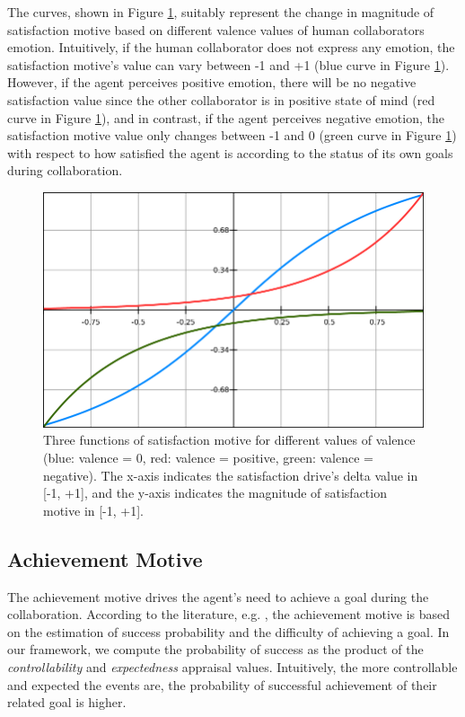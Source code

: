 \documentclass[12pt]{report}
\begin{document}
{\color{red}The curves, shown in Figure \ref{fig:satisfaction-motive-functions},
suitably represent the change in magnitude of satisfaction motive based on
different valence values of human collaborators emotion.}
Intuitively, if the human collaborator does not express any emotion, the
satisfaction motive's value can vary between -1 and +1 (blue curve in Figure
\ref{fig:satisfaction-motive-functions}). However, if the agent perceives
positive emotion, there will be no negative satisfaction value since the other
collaborator is in positive state of mind (red curve in Figure
\ref{fig:satisfaction-motive-functions}), and in contrast, if the agent
perceives negative emotion, the satisfaction motive value only changes between
-1 and 0 (green curve in Figure \ref{fig:satisfaction-motive-functions}) with
respect to how satisfied the agent is according to the status of its own goals
during collaboration.

\begin{figure}[tbh]
  \centering
  \includegraphics[width=1\textwidth]{figure/satisfaction_motive_functions.png}
  \caption{Three functions of satisfaction motive for different values of
  valence (blue: valence = 0, red: valence = positive, green: valence =
  negative). The x-axis indicates the satisfaction drive's delta value in [-1,
  +1], and the y-axis indicates the magnitude of satisfaction motive in [-1,
  +1].}
  \label{fig:satisfaction-motive-functions}
\end{figure}

\subsection{Achievement Motive}
The achievement motive drives the agent's need to achieve a goal during the
collaboration. According to the literature, e.g.
\cite{merrick:acheievement-affiliation-power}, the achievement motive is based
on the estimation of success probability and the difficulty of achieving a goal.
In our framework, we compute the probability of success as the product of the
\textit{controllability} and \textit{expectedness} appraisal values.
Intuitively, the more controllable and expected the events are, the probability
of successful achievement of their related goal is higher.
\end{document}
